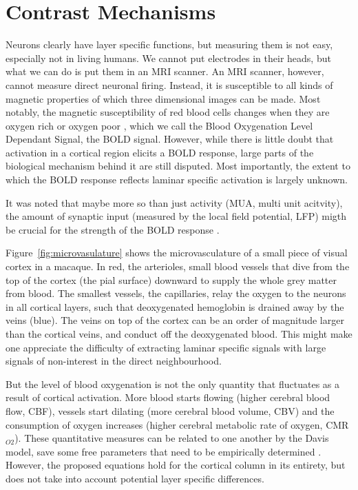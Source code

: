 \section{Contrast Mechanisms}
Neurons clearly have layer specific functions, but measuring them is not easy, especially not in living humans. We cannot put electrodes in their heads, but what we can do is put them in an MRI scanner. An MRI scanner, however, cannot measure direct neuronal firing. Instead, it is susceptible to all kinds of magnetic properties of which three dimensional images can be made. Most notably, the magnetic susceptibility of red blood cells changes when they are oxygen rich or oxygen poor \cite{Ogawa1990}, which we call the Blood Oxygenation Level Dependant Signal, the BOLD signal. However, while there is little doubt that activation in a cortical region elicits a BOLD response, large parts of the biological mechanism behind it are still disputed. Most importantly, the extent to which the BOLD response reflects laminar specific activation is largely unknown. 

It was noted that maybe more so than just activity (MUA, multi unit acitvity), the amount of synaptic input (measured by the local field potential, LFP) migth be crucial for the strength of the BOLD response \cite{Goense2008}.


Figure~\ref{fig:microvasulature} shows the microvasculature of a small piece of visual cortex in a macaque. In red, the arterioles, small blood vessels that dive from the top of the cortex (the pial surface) downward to supply the whole grey matter from blood. The smallest vessels, the capillaries, relay the oxygen to the neurons in all cortical layers, such that deoxygenated hemoglobin is drained away by the veins (blue). The veins on top of the cortex can be an order of magnitude larger than the cortical veins, and conduct off the deoxygenated blood. This might make one appreciate the difficulty of extracting laminar specific signals with large signals of non-interest in the direct neighbourhood. 

But the level of blood oxygenation is not the only quantity that fluctuates as a result of cortical activation. More blood starts flowing (higher cerebral blood flow, CBF), vessels start dilating (more cerebral blood volume, CBV) and the consumption of oxygen increases (higher cerebral metabolic rate of oxygen, CMR$_{O2}$). These quantitative measures can be related to one another by the Davis model, save some free parameters that need to be empirically determined \cite{Davis1997}. However, the proposed equations hold for the cortical column in its entirety, but does not take into account potential layer specific differences. 

